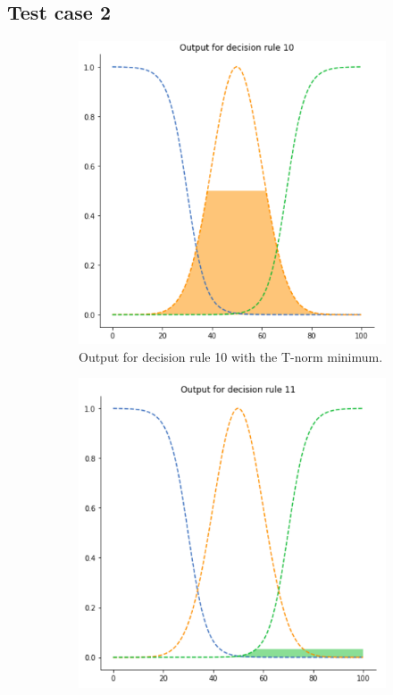 \documentclass[conference]{IEEEtran}
\begin{document}
\subsection{Test case 2}
\begin{figure}[ht]
\begin{subfigure}{.5\textwidth}
  \centering
  \includegraphics[width=.8\linewidth]{figures/second/min1.png}  
  \caption{Output for decision rule 10 with the T-norm minimum.}
  \label{fig:2min1}
\end{subfigure}
\begin{subfigure}{.5\textwidth}
  \centering
  \includegraphics[width=.8\linewidth]{figures/second/min2.png}  

\end{subfigure}
\end{figure}
\end{document}
